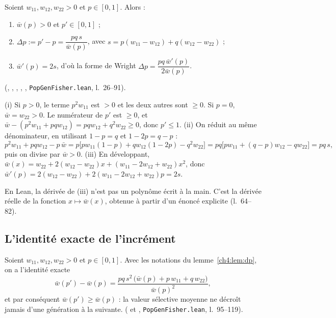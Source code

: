 \begin{lemma}\label{ch4:lem:dp}
Soient $w_{11},w_{12},w_{22}>0$ et $p\in[0,1]$. Alors :
\begin{enumerate}[label=(\roman*),itemsep=1pt]
\item $\bar w(p)>0$ et $p'\in[0,1]$ ;
\item $\Delta p:=p'-p=\dfrac{pq\,s}{\bar w(p)}$, avec $s=p(w_{11}-w_{12})+q(w_{12}-w_{22})$ ;
\item $\bar w'(p)=2s$, d'où la forme de Wright $\Delta p=\dfrac{pq\,\bar w'(p)}{2\bar w(p)}$.
\end{enumerate}
\tierA{} (, , , ,
, \texttt{PopGenFisher.lean}, l.~26--91).
\end{lemma}

\begin{humanproof}
(i) Si $p>0$, le terme $p^2w_{11}$ est $>0$ et les deux autres sont $\ge0$. Si $p=0$, $\bar w=w_{22}>0$. Le
numérateur de $p'$ est $\ge0$, et $\bar w-(p^2w_{11}+pqw_{12})=pqw_{12}+q^2w_{22}\ge0$, donc $p'\le1$.
(ii) On réduit au même dénominateur, en utilisant $1-p=q$ et $1-2p=q-p$ :
\[
p^2w_{11}+pqw_{12}-p\,\bar w
=p\bigl[pw_{11}(1-p)+qw_{12}(1-2p)-q^2w_{22}\bigr]
=pq\bigl[pw_{11}+(q-p)w_{12}-qw_{22}\bigr]=pq\,s ,
\]
puis on divise par $\bar w>0$.
(iii) En développant, $\bar w(x)=w_{22}+2(w_{12}-w_{22})x+(w_{11}-2w_{12}+w_{22})x^2$, donc
$\bar w'(p)=2(w_{12}-w_{22})+2(w_{11}-2w_{12}+w_{22})p=2s$.
\end{humanproof}

En Lean, la dérivée de (iii) n'est pas un polynôme écrit à la main. C'est la dérivée réelle  de la
fonction $x\mapsto\bar w(x)$, obtenue à partir d'un énoncé  explicite (l.~64--82).

\subsection{L'identité exacte de l'incrément}

\begin{theorem}\label{ch4:thm:wbar}
Soient $w_{11},w_{12},w_{22}>0$ et $p\in[0,1]$. Avec les notations du lemme~\ref{ch4:lem:dp}, on a l'identité
exacte
\begin{equation}\label{ch4:eq:increment}
\bar w(p')-\bar w(p)=\frac{pq\,s^2\,\bigl(\bar w(p)+p\,w_{11}+q\,w_{22}\bigr)}{\bar w(p)^2},
\end{equation}
et par conséquent $\bar w(p')\ge\bar w(p)$ : la valeur sélective moyenne ne décroît jamais d'une génération à la
suivante. \tierA{} ( et ,
\texttt{PopGenFisher.lean}, l.~95--119).
\end{theorem}

